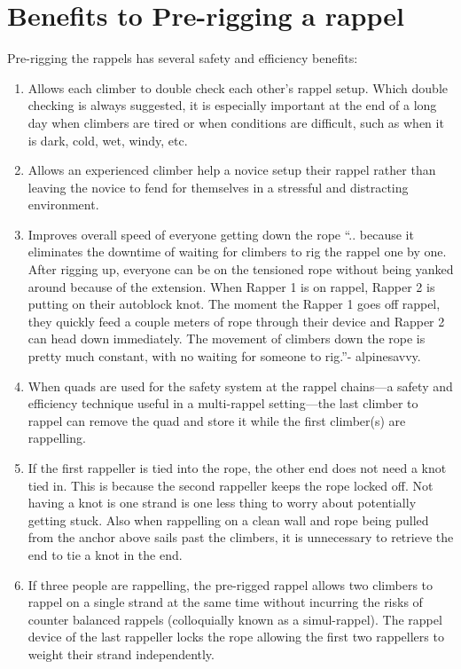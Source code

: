\documentclass[nonacm,acmtog,authordraft]{acmart}
\begin{document}
\section{Benefits to Pre-rigging a rappel}

  Pre-rigging the rappels has several safety and efficiency benefits:

  \begin{enumerate}
  \item Allows each climber to double check each other's rappel setup.  Which
    double checking is always suggested, it is especially important at the end
    of a long day when climbers are tired or when conditions are difficult,
    such as when it is dark, cold, wet, windy, etc.
  \item Allows an experienced climber help a novice setup their rappel rather
    than leaving the novice to fend for themselves in a stressful and
    distracting environment.
  \item Improves overall speed of everyone getting down the rope ``.. because
    it eliminates the downtime of waiting for climbers to rig the rappel one by
    one.  After rigging up, everyone can be on the tensioned rope without being
    yanked around because of the extension. When Rapper 1 is on rappel, Rapper
    2 is putting on their autoblock knot. The moment the Rapper 1 goes off
    rappel, they quickly feed a couple meters of rope through their device and
    Rapper 2 can head down immediately. The movement of climbers down the rope
    is pretty much constant, with no waiting for someone to rig.''-
    alpinesavvy.
  \item When quads are used for the safety system at the rappel chains---a
    safety and efficiency technique useful in a multi-rappel setting---the last
    climber to rappel can remove the quad and store it while the first
    climber(s) are rappelling.
  \item If the first rappeller is tied into the rope, the other end does not
    need a knot tied in. This is because the second rappeller keeps the rope
    locked off.  Not having a knot is one strand is one less thing to worry
    about potentially getting stuck. Also when rappelling on a clean wall and
    rope being pulled from the anchor above sails past the climbers, it is
    unnecessary to retrieve the end to tie a knot in the end.
  \item If three people are rappelling, the pre-rigged rappel allows two
    climbers to rappel on a single strand at the same time without incurring
    the risks of counter balanced rappels (colloquially known as a
    simul-rappel).  The rappel device of the last rappeller locks the rope
    allowing the first two rappellers to weight their strand independently.
  \end{enumerate}
\end{document}
